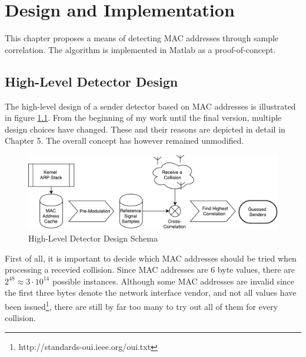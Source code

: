 
\chapter{Design and Implementation}\label{ch:design}
\glsresetall %

This chapter proposes a means of detecting \gls{MAC} addresses through sample correlation. The algorithm is implemented in Matlab as a proof-of-concept.



\section{High-Level Detector Design}

The high-level design of a sender detector based on \gls{MAC} addresses is illustrated in figure \ref{fig:blockdesign}. From the beginning of my work until the final version, multiple design choices have changed. These and their reasons are depicted in detail in Chapter 5. The overall concept has however remained unmodified.

\begin{figure}[H]
	\centering
	\includegraphics[width=\textwidth]{gfx/images/detector-block-design}
	\caption[High-Level Detector Design Schema]{High-Level Detector Design Schema}
	\label{fig:blockdesign}
\end{figure}

First of all, it is important to decide which \gls{MAC} addresses should be tried when processing a recevied collision. Since \gls{MAC} addresses are 6 byte values, there are $2^{48} \approx 3 \cdot 10^{14}$ possible instances. Although some \gls{MAC} addresses are invalid since the first three bytes denote the network interface vendor, and not all values have been issued\footnote{http://standards-oui.ieee.org/oui.txt}, there are still by far too many to try out all of them for every collision.


